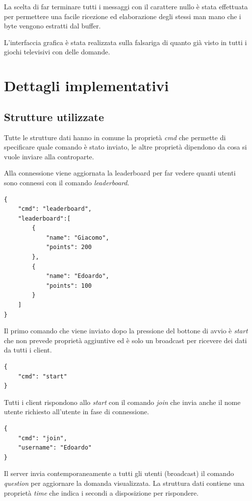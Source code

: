 \documentclass[a4paper,12pt]{report}
\begin{document}
La scelta di far terminare tutti i messaggi con il carattere nullo è stata effettuata per permettere una facile ricezione ed elaborazione degli stessi man mano che i byte vengono estratti dal buffer.

L'interfaccia grafica è stata realizzata sulla falsariga di quanto già visto in tutti i giochi televisivi con delle domande.

\chapter{Dettagli implementativi}
	
\section{Strutture utilizzate}

Tutte le strutture dati hanno in comune la proprietà \emph{cmd} che permette di specificare quale comando è stato inviato, le altre proprietà dipendono da cosa si vuole inviare alla controparte.

Alla connessione viene aggiornata la leaderboard per far vedere quanti utenti sono connessi con il comando \emph{leaderboard}.

\begin{lstlisting}
{
    "cmd": "leaderboard",
    "leaderboard":[
        {
            "name": "Giacomo",
            "points": 200
        },
        {
            "name": "Edoardo",
            "points": 100
        }
    ]
}
\end{lstlisting}

Il primo comando che viene inviato dopo la pressione del bottone di avvio è \emph{start} che non prevede proprietà aggiuntive ed è solo un broadcast per ricevere dei dati da tutti i client.

\begin{lstlisting}
{
    "cmd": "start"
}
\end{lstlisting}
				
Tutti i client rispondono allo \emph{start} con il comando \emph{join} che invia anche il nome utente richiesto all'utente in fase di connessione.
				
\begin{lstlisting}
{
    "cmd": "join",
    "username": "Edoardo"
}
\end{lstlisting}


Il server invia contemporaneamente a tutti gli utenti (broadcast) il comando \emph{question} per aggiornare la domanda visualizzata. La struttura dati contiene una proprietà \emph{time} che indica i secondi a disposizione per rispondere.
\end{document}
